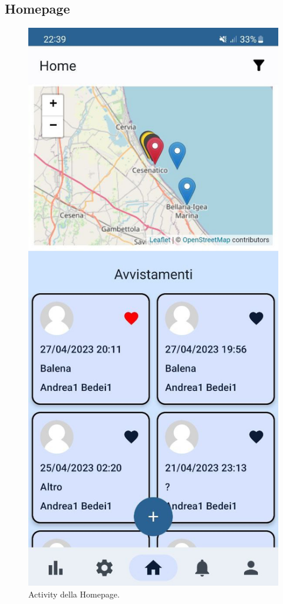 \documentclass[a4paper,final,12pt]{report}
\begin{document}
\newpage

\subsection{Homepage}
\begin{figure}[hbtp]
\centering
\includegraphics[scale=0.19]{img_concettuale/hommob.jpg}
\caption{Activity della Homepage.}
\end{figure}
\end{document}
